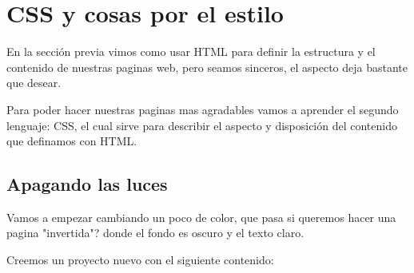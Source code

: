 \documentclass[letterpaper,10pt,spanish]{sphinxmanual}
\begin{document}
\begin{figure}[htbp]
\centering

\noindent{}
\end{figure}


\chapter{CSS y cosas por el estilo}
\label{\detokenize{css-y-cosas-por-el-estilo::doc}}\label{\detokenize{css-y-cosas-por-el-estilo:css-y-cosas-por-el-estilo}}
En la sección previa vimos como usar HTML para definir la estructura y el
contenido de nuestras paginas web, pero seamos sinceros, el aspecto deja
bastante que desear.

Para poder hacer nuestras paginas mas agradables vamos a aprender el segundo
lenguaje: CSS, el cual sirve para describir el aspecto y disposición del
contenido que definamos con HTML.


\section{Apagando las luces}
\label{\detokenize{css-y-cosas-por-el-estilo:apagando-las-luces}}
Vamos a empezar cambiando un poco de color, que pasa si queremos hacer una
pagina "invertida"? donde el fondo es oscuro y el texto claro.

Creemos un proyecto nuevo con el siguiente contenido:
\end{document}
